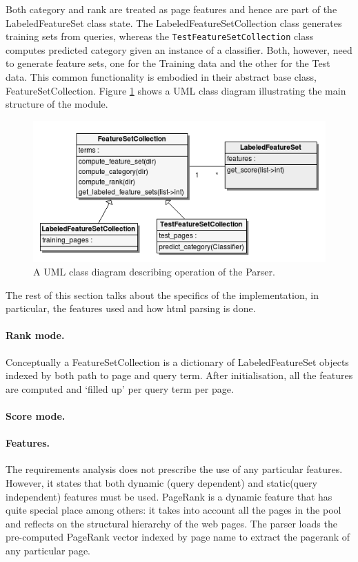 \documentclass[12pt,twoside,notitlepage]{report}
\begin{document}
Both category and rank are treated as page features and hence are part of the
LabeledFeatureSet class state.  The LabeledFeatureSetCollection class generates
training sets from queries, whereas the \texttt{TestFeatureSetCollection} class computes
predicted category given an instance of a classifier. Both, however, need to generate
feature sets, one for the Training data and the other for the Test data. This
common functionality is embodied in their abstract base class, FeatureSetCollection.
Figure \ref{uml} shows a UML class diagram illustrating the main structure
of the module.

\begin{figure}
\centering
\includegraphics[scale=0.5]{figs/uml.png}
\caption{A UML class diagram describing operation of the Parser.}
\label{uml}
\end{figure}

The rest of this section talks about the specifics of the implementation, in
particular, the features used and how html parsing is done.

\paragraph{Rank mode.}
Conceptually a FeatureSetCollection is a dictionary of LabeledFeatureSet
objects indexed by both path to page and  query term. After initialisation, all
the features are computed and `filled up' per query term per page.

\paragraph{Score mode.}
\paragraph{Features.}


The requirements analysis does not prescribe the use of any particular
features. However, it states that both dynamic (query dependent) and
static(query independent) features must be used. PageRank is a dynamic feature
that has quite special place among others: it takes into account all the pages
in the pool and reflects on the structural hierarchy of the web pages. 
The parser loads the pre-computed PageRank vector indexed by page name to
extract the pagerank of any particular page.
\end{document}
